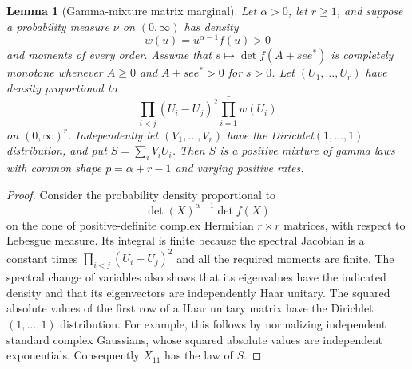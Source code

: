 \documentclass[11pt,a4paper]{article}
\newtheorem{lemma}[theorem]{Lemma}
\theoremstyle{definition}
\theoremstyle{remark}
\numberwithin{equation}{section}
\begin{document}
\begin{lemma}[Gamma-mixture matrix marginal]\label{ya:matrix-marginal}
Let $\alpha>0$, let $r\ge1$, and suppose a probability measure $\nu$
on $(0,\infty)$ has density
\[
 w(u)=u^{\alpha-1}f(u)>0
\]
and moments of every order. Assume that
$s\mapsto\det f(A+see^*)$ is completely monotone whenever
$A\ge0$ and $A+see^*>0$ for $s>0$.
Let $(U_1,\ldots,U_r)$ have density proportional to
\[
 \prod_{i<j}(U_i-U_j)^2\prod_{i=1}^r w(U_i)
\]
on $(0,\infty)^r$. Independently let
$(V_1,\ldots,V_r)$ have the Dirichlet$(1,\ldots,1)$ distribution,
and put $S=\sum_iV_iU_i$.
Then $S$ is a positive mixture of gamma laws with common shape
$p=\alpha+r-1$ and varying positive rates.
\end{lemma}
\begin{proof}
Consider the probability density proportional to
\[
 \det(X)^{\alpha-1}\det f(X)
\]
on the cone of positive-definite complex Hermitian $r\times r$
matrices, with respect to Lebesgue measure. Its integral is finite
because the spectral Jacobian is a constant times
$\prod_{i<j}(U_i-U_j)^2$ and all the required moments are finite.
The spectral change of variables also shows that its eigenvalues have
the indicated density and that its eigenvectors are independently
Haar unitary. The squared absolute values of the first row of a Haar
unitary matrix have the Dirichlet$(1,\ldots,1)$ distribution. For
example, this follows by normalizing independent standard complex
Gaussians, whose squared absolute values are independent exponentials.
Consequently $X_{11}$ has the law of $S$.


\end{proof}
\end{document}
